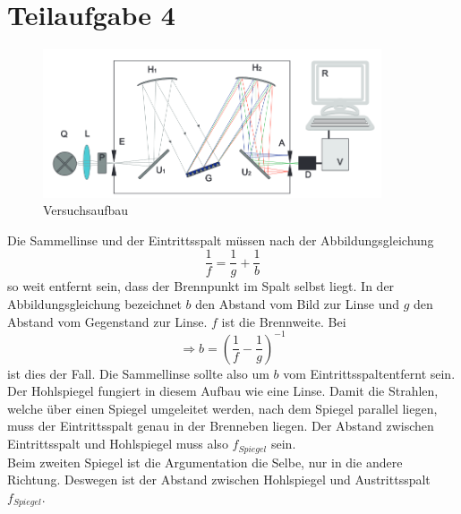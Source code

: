 

\section{Teilaufgabe 4}

\begin{figure}[h]
    \begin{center}
        \includegraphics[width=10cm]{Bilder/SP1.PNG}
    \end{center}
    \caption{Versuchsaufbau}
   \end{figure}
Die Sammellinse und der Eintrittsspalt müssen nach der Abbildungsgleichung \\
\begin{equation}
    \frac{1}{f}= \frac{1}{g}+\frac{1}{b}   
\end{equation}
so weit entfernt sein, dass der Brennpunkt im Spalt selbst liegt. In der Abbildungsgleichung bezeichnet $b$ den Abstand vom Bild zur Linse und $g$ den Abstand vom Gegenstand zur Linse. $f$ ist die Brennweite. Bei 
\begin{equation}
    \Rightarrow b = (\frac{1}{f}-\frac{1}{g})^{-1}
\end{equation}
ist dies der Fall. Die Sammellinse sollte also um $b$ vom Eintrittsspaltentfernt sein.\\
Der Hohlspiegel fungiert in diesem Aufbau wie eine Linse. Damit die Strahlen, welche über einen Spiegel umgeleitet werden, nach dem Spiegel parallel liegen, muss der Eintrittsspalt genau in der Brenneben liegen. Der Abstand zwischen Eintrittsspalt und Hohlspiegel muss also $f_{Spiegel}$ sein.\\
Beim zweiten Spiegel ist die Argumentation die Selbe, nur in die andere Richtung. Deswegen ist der Abstand zwischen Hohlspiegel und Austrittsspalt $f_{Spiegel}$.